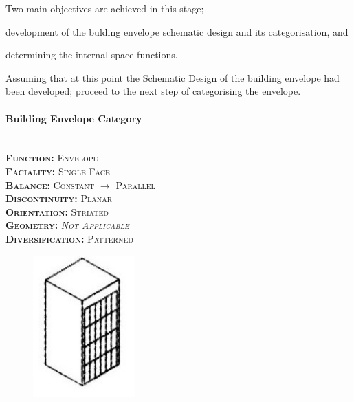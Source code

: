 Two main objectives are achieved in this stage; \begin{inparaenum}[a)] \item development of the bulding envelope schematic design and its categorisation, and \item determining the internal space functions.\end{inparaenum}

Assuming that at this point the Schematic Design of the building envelope had been developed; proceed to the next step of categorising the envelope.

\setlength{\columnseprule}{0pt}
\begin{multicols}{2}
	\paragraph{Building Envelope Category}\mbox{}\\
	\vspace {0.5cm}	
	\small \textsc{\textbf{Function:} Envelope\\
	\vspace {0.3cm}
	\textbf{Faciality:} Single Face\\
	\vspace {0.3cm}
	\textbf{Balance:} Constant $\rightarrow$ Parallel\\
	\vspace {0.3cm}
	\textbf{Discontinuity:} Planar\\
	\vspace {0.3cm}
	\textbf{Orientation:} Striated\\
	\vspace {0.3cm}
	\textbf{Geometry:} \emph{Not Applicable}\\
	\vspace {0.3cm}
	\textbf{Diversification:} Patterned\\}
	\normalsize
	\columnbreak
	\begin{figure}[H]
		\centering
		\includegraphics[width=0.35\textwidth]{./Images/10-Envelope1}
	\end{figure}
\end{multicols}
\vspace{-5mm}

